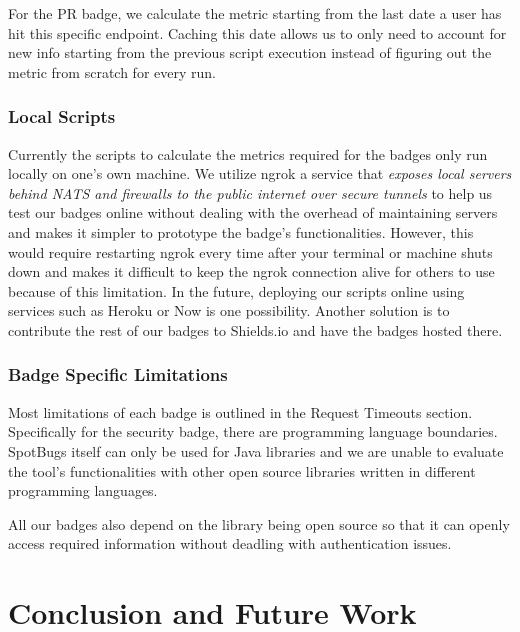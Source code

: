 \documentclass[12pt, letterpaper]{article}
\begin{document}
For the PR badge, we calculate the metric starting from the last date a user has hit this specific endpoint.
Caching this date allows us to only need to account for new info starting from the previous script execution
instead of figuring out the metric from scratch for every run.


\subsubsection{Local Scripts}
Currently the scripts to calculate the metrics required for the badges only run
locally on one's own machine. We utilize ngrok
\cite{ngrok} a service that \textit{exposes local servers behind NATS and firewalls to the public
internet over secure tunnels} to help us test our badges online without dealing with the overhead of maintaining
servers and makes it simpler to prototype the badge's functionalities. 
However, this would require restarting ngrok every time after your terminal or machine shuts down
and makes it difficult to keep the ngrok connection alive for others to use because of this limitation.
In the future, deploying our scripts online using services such as Heroku \cite{heroku} or Now \cite{nowjs}
is one possibility. Another solution is to contribute the rest of our badges to Shields.io \cite{shieldsrepo}
and have the badges hosted there.

\subsubsection{Badge Specific Limitations}
Most limitations of each badge is outlined in the Request Timeouts section.
Specifically for the security badge, there are programming language boundaries.
SpotBugs \cite{spotbugs} itself can only be used for Java libraries and we are 
unable to evaluate the tool's functionalities with other open source libraries written
in different programming languages.


All our badges also depend on the library being open source so that it can openly
access required information without deadling with authentication issues.

\section{Conclusion and Future Work}


\newpage


\end{document}
